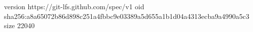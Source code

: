 version https://git-lfs.github.com/spec/v1
oid sha256:a8a65072b86d898c251a4fbbc9e03389a5d655a1b1d04a4313ecba9a4990a5c3
size 22040
